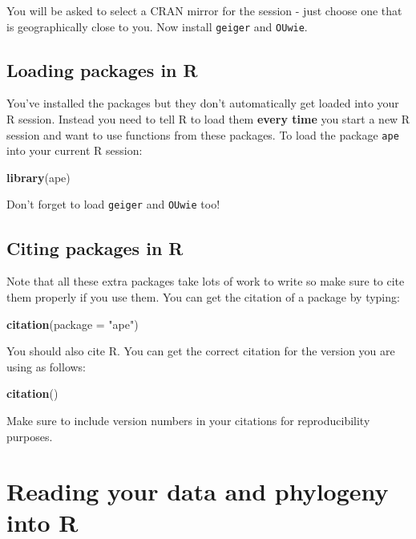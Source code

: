 \documentclass[11pt]{article}
\newcommand{\KeywordTok}[1]{\textcolor[rgb]{0.13,0.29,0.53}{\textbf{{#1}}}}
\newcommand{\StringTok}[1]{\textcolor[rgb]{0.31,0.60,0.02}{{#1}}}
\newcommand{\NormalTok}[1]{{#1}}
\begin{document}
You will be asked to select a CRAN mirror for the session - just choose one that is geographically close to you. Now install \texttt{geiger} and \texttt{OUwie}.

\subsection{Loading packages in R}

You've installed the packages but they don't automatically get loaded
into your R session. Instead you need to tell R to load them \textbf{every
time} you start a new R session and want to use functions from these
packages. To load the package \texttt{ape} into your current R session:

\begin{snugshade}
\begin{Highlighting}[]
\KeywordTok{library}\NormalTok{(ape)}
\end{Highlighting}
\end{snugshade}

Don't forget to load \texttt{geiger} and \texttt{OUwie} too!

\subsection{Citing packages in R}\label{citing-packages}

Note that all these extra packages take lots of work to write so
make sure to cite them properly if you use them. You can get
the citation of a package by typing: 

\begin{snugshade}
\begin{Highlighting}[]
\KeywordTok{citation}\NormalTok{(package = }\StringTok{"ape"}\NormalTok{)}
\end{Highlighting}
\end{snugshade}

You should also cite R. You can get the correct citation for the version
you are using as follows:

\begin{snugshade}
\begin{Highlighting}[]
\KeywordTok{citation}\NormalTok{()}
\end{Highlighting}
\end{snugshade}

Make sure to include version numbers in your citations for reproducibility purposes.

\section{Reading your data and phylogeny into R}
\end{document}
